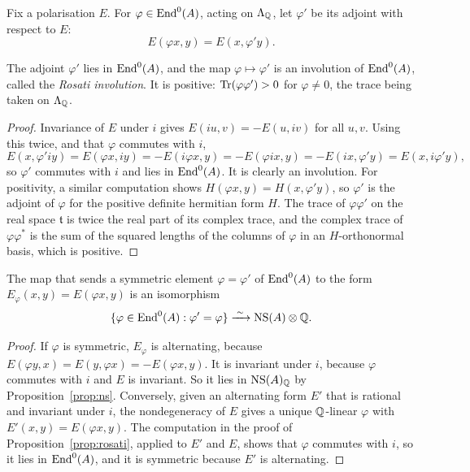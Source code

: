 Fix a polarisation $E$. For $\varphi\in\operatorname{End}^{0}(A)$, acting on
$\Lambda_{\mathbb{Q}}$, let $\varphi'$ be its adjoint with respect to $E$:
\[
  E(\varphi x,y)=E(x,\varphi'y).
\]

\begin{proposition}\label{prop:rosati}
The adjoint $\varphi'$ lies in $\operatorname{End}^{0}(A)$, and the map
$\varphi\mapsto\varphi'$ is an involution of $\operatorname{End}^{0}(A)$, called the
\emph{Rosati involution}. It is positive: $\operatorname{Tr}(\varphi\varphi')>0$ for
$\varphi\ne0$, the trace being taken on $\Lambda_{\mathbb{Q}}$.
\end{proposition}

\begin{proof}
Invariance of $E$ under $i$ gives $E(iu,v)=-E(u,iv)$ for all $u,v$. Using
this twice, and that $\varphi$ commutes with $i$,
\[
  E(x,\varphi'iy)=E(\varphi x,iy)=-E(i\varphi x,y)=-E(\varphi ix,y)
  =-E(ix,\varphi'y)=E(x,i\varphi'y),
\]
so $\varphi'$ commutes with $i$ and lies in $\operatorname{End}^{0}(A)$. It is clearly an
involution. For positivity, a similar computation shows
$H(\varphi x,y)=H(x,\varphi'y)$, so $\varphi'$ is the adjoint of $\varphi$
for the positive definite hermitian form $H$. The trace of $\varphi\varphi'$
on the real space $\mathfrak{t}$ is twice the real part of its complex trace, and the
complex trace of $\varphi\varphi^{*}$ is the sum of the squared lengths of
the columns of $\varphi$ in an $H$-orthonormal basis, which is positive.
\end{proof}

\begin{proposition}\label{prop:nssym}
The map that sends a symmetric element $\varphi=\varphi'$ of $\operatorname{End}^{0}(A)$
to the form $E_{\varphi}(x,y)=E(\varphi x,y)$ is an isomorphism
\[
  \{\varphi\in\operatorname{End}^{0}(A):\varphi'=\varphi\}\xrightarrow{\;\sim\;}
  \operatorname{NS}(A)\otimes\mathbb{Q} .
\]
\end{proposition}

\begin{proof}
If $\varphi$ is symmetric, $E_{\varphi}$ is alternating, because
$E(\varphi y,x)=E(y,\varphi x)=-E(\varphi x,y)$. It is invariant under $i$,
because $\varphi$ commutes with $i$ and $E$ is invariant. So it lies in
$\operatorname{NS}(A)_{\mathbb{Q}}$ by Proposition~\ref{prop:ns}. Conversely, given an
alternating form $E'$ that is rational and invariant under $i$, the
nondegeneracy of $E$ gives a unique $\mathbb{Q}$-linear $\varphi$ with
$E'(x,y)=E(\varphi x,y)$. The computation in the proof of
Proposition~\ref{prop:rosati}, applied to $E'$ and $E$, shows that $\varphi$
commutes with $i$, so it lies in $\operatorname{End}^{0}(A)$, and it is symmetric because
$E'$ is alternating.
\end{proof}

